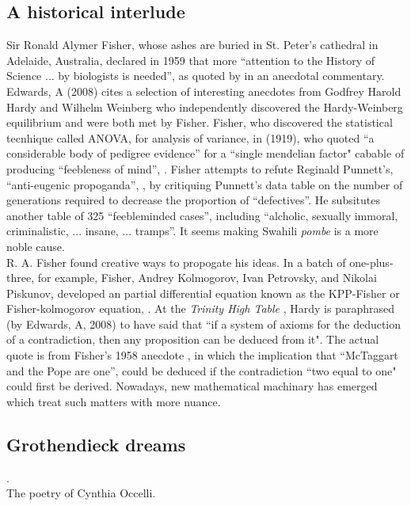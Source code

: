 \subsection{A historical interlude}
Sir Ronald Alymer Fisher, whose ashes are buried in St. Peter's cathedral in Adelaide, Australia,
declared in 1959 that more ``attention to the History of Science ... by biologists is needed'',
as quoted by \cite{edwards2008gh} in an anecdotal commentary. Edwards, A (2008) cites
a selection of interesting anecdotes from Godfrey Harold Hardy and Wilhelm Weinberg who 
independently discovered the Hardy-Weinberg equilibrium and were both met by Fisher.
Fisher, who discovered the statistical tecnhique called ANOVA, for analysis of variance, in 
\cite{fisher1919xv} (1919), who quoted ``a considerable body of pedigree evidence'' for 
a ``single mendelian factor" cabable of producing ``feebleness of mind'', 
\cite{fisher1924elimination}. Fisher attempts to refute Reginald Punnett's, 
``anti-eugenic propoganda'', \cite{fisher1924elimination}, by critiquing
Punnett's data table on the number of generations required to decrease 
the proportion of ``defectives''. He subsitutes another table of 325 ``feebleminded cases'',
including ``alcholic, sexually immoral, criminalistic, ... insane, ... tramps''.
It seems making Swahili \textit{pombe} is a more noble cause.
\\

R. A. Fisher found creative ways to propogate his ideas. In a batch of one-plus-three, 
for example, Fisher, Andrey Kolmogorov, Ivan Petrovsky, and Nikolai Piskunov,
developed an partial differential equation known as the KPP-Fisher or
Fisher-kolmogorov equation, \cite{fisher1937wave}. At the \textit{Trinity High Table}
, Hardy is paraphrased (by Edwards, A, 2008) to have said that ``if a system of axioms 
for the deduction of a contradiction, then any proposition can be deduced from it".
The actual quote is from Fisher's 1958 anecdote \cite{edwards2008gh}, 
in which the implication that ``McTaggart and the Pope are one'', 
could be deduced if the contradiction ``two equal to one" could first be derived. 
Nowadays, new mathematical machinary has emerged which 
treat such matters with more nuance.
\\

\subsection{Grothendieck dreams}

. 
\\
The poetry of Cynthia Occelli.




